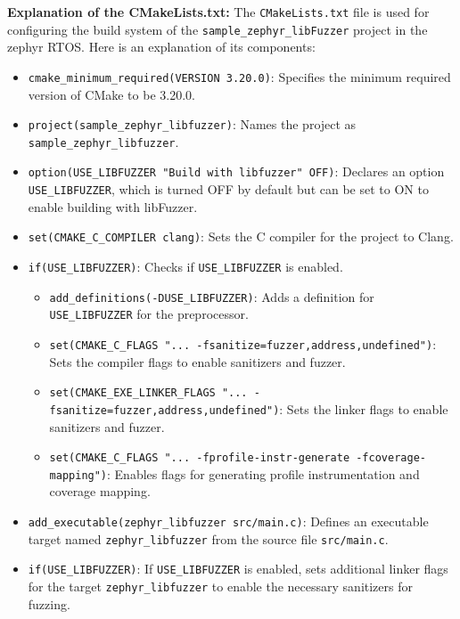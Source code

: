 \textbf{Explanation of the CMakeLists.txt:}
The \texttt{CMakeLists.txt} file is used for configuring the build system
of the \texttt{sample\_zephyr\_libFuzzer} project in the zephyr RTOS.
Here is an explanation of its components:

\begin{itemize}
    \item \texttt{cmake\_minimum\_required(VERSION 3.20.0)}: Specifies the minimum required version of CMake to be 3.20.0.

    \item \texttt{project(sample\_zephyr\_libfuzzer)}: Names the project as \texttt{sample\_zephyr\_libfuzzer}.

    \item \texttt{option(USE\_LIBFUZZER "Build with libfuzzer" OFF)}: Declares an option \texttt{USE\_LIBFUZZER}, which is turned OFF by default but can be set to ON to enable building with libFuzzer.

    \item \texttt{set(CMAKE\_C\_COMPILER clang)}: Sets the C compiler for the project to Clang.

    \item \texttt{if(USE\_LIBFUZZER)}: Checks if \texttt{USE\_LIBFUZZER} is enabled.

    \begin{itemize}
        \item \texttt{add\_definitions(-DUSE\_LIBFUZZER)}: Adds a definition for \texttt{USE\_LIBFUZZER} for the preprocessor.

        \item \texttt{set(CMAKE\_C\_FLAGS "... -fsanitize=fuzzer,address,undefined")}: Sets the compiler flags to enable sanitizers and fuzzer.

        \item \texttt{set(CMAKE\_EXE\_LINKER\_FLAGS "... -fsanitize=fuzzer,address,undefined")}: Sets the linker flags to enable sanitizers and fuzzer.

        \item \texttt{set(CMAKE\_C\_FLAGS "... -fprofile-instr-generate -fcoverage-mapping")}: Enables flags for generating profile instrumentation and coverage mapping.
    \end{itemize}

    \item \texttt{add\_executable(zephyr\_libfuzzer src/main.c)}: Defines an executable target named \texttt{zephyr\_libfuzzer} from the source file \texttt{src/main.c}.

    \item \texttt{if(USE\_LIBFUZZER)}: If \texttt{USE\_LIBFUZZER} is enabled, sets additional linker flags for the target \texttt{zephyr\_libfuzzer} to enable the necessary sanitizers for fuzzing.
\end{itemize}

